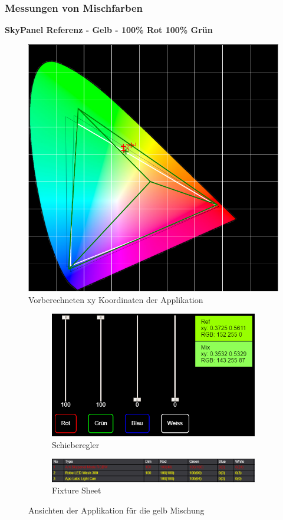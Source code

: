 \documentclass[11pt]{scrartcl}
\begin{document}
\subsubsection{Messungen von Mischfarben} \label{equalizationMeasurments}
\textbf{SkyPanel Referenz - Gelb - 100\% Rot 100\% Grün}
\begin{figure}[H]
    \begin{center}
        \includegraphics[width=.8\textwidth]{images/app_mix_yellow_cie.png}
    \end{center}
    \caption{Vorberechneten xy Koordinaten der Applikation}
\end{figure}
\noindent
\begin{figure}[H]
    \centering
    \begin{subfigure}[b]{.39\textwidth}
        \includegraphics[width=\textwidth]{images/app_mix_yellow_faders.png}
        \caption{Schieberegler}
    \end{subfigure}
    \hfill 
    \begin{subfigure}[b]{.59\textwidth}
        \includegraphics[width=\textwidth]{images/app_mix_yellow_fixtureSheet.png}
        \caption{Fixture Sheet}
    \end{subfigure}
    \caption{Ansichten der Applikation für die gelb Mischung}
\end{figure}
\end{document}
